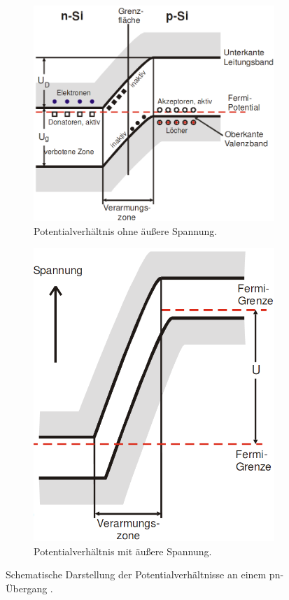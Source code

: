 \begin{figure}[H]
	\centering
	\begin{subfigure}[b]{0.49\linewidth}
		\includegraphics[width=\linewidth]{Bilder/V1.png}
		\caption{Potentialverhältnis ohne äußere Spannung.}
	\end{subfigure}
	\begin{subfigure}[b]{0.49\linewidth}
		\includegraphics[width=\linewidth]{Bilder/V2.png}
		\caption{Potentialverhältnis mit äußere Spannung.}
	\end{subfigure}
	\caption{Schematische Darstellung der Potentialverhältnisse an einem pn-Übergang \cite{V18}.}
\end{figure}

